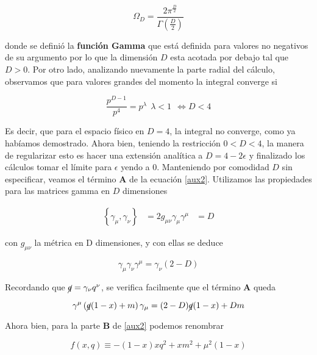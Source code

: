 \documentclass{article}
\numberwithin{equation}{section}
\begin{document}
\begin{equation}\label{angulosolido}
\Omega_D = \frac{2 \pi^{\frac{D}{2}}}{\Gamma (\frac{D}{2})}
\end{equation}

donde se definió la \textbf{función Gamma} que está definida para valores no negativos de su argumento por lo que la dimensión $ D $ esta acotada por debajo tal que $ D>0 $. Por otro lado, analizando nuevamente la parte radial del cálculo, observamos que para valores grandes del momento la integral converge si

\begin{equation}\label{key}
\frac{p^{D-1}}{p^4} = p^{\lambda} \ \ \lambda<1 \ \ \iff D < 4
\end{equation}

Es decir, que para el espacio físico en $ D=4 $, la integral no converge, como ya habíamos demostrado. Ahora bien, teniendo la restricción $ 0<D<4 $, la manera de regularizar esto es hacer una extensión analítica a $ D= 4 -2\epsilon $ y finalizado los cálculos tomar el límite para $ \epsilon $ yendo a $ 0 $. Manteniendo por comodidad $ D $ sin especificar, veamos el término $ \textbf{A} $ de la ecuación \ref{aux2}. Utilizamos las propiedades para las matrices gamma en $ D $ dimensiones

\begin{equation}
\begin{aligned}
\left\{\gamma_{\mu},\gamma_{\nu}\right\} &= 2 g_{\mu\nu}
\gamma_{\mu}\gamma^{\mu}&=D
\end{aligned}
\end{equation}
 
con $ g_{\mu\nu} $ la métrica en D dimensiones, y con ellas se deduce

\begin{equation}\label{key}
\gamma_{\mu}\gamma_{\nu}\gamma^{\mu}=\gamma_{\nu}(2-D)
\end{equation}
 
Recordando que $ \cancel{q}=\gamma_{\nu}q^{\nu} $, se verifica facilmente que el término $ \textbf{A} $ queda

\begin{equation}\label{A}
\gamma^{\mu}\left(\cancel{q}(1-x)+m\right) \gamma_{\mu} = (2-D)\cancel{q}(1-x)+Dm
\end{equation}

Ahora bien, para la parte $ \textbf{B} $ de \ref{aux2} podemos renombrar 

\begin{equation}\label{key}
f(x,q) \equiv -(1-x)xq^{2} + x m^{2} + \mu^{2}(1-x)
\end{equation}
\end{document}
